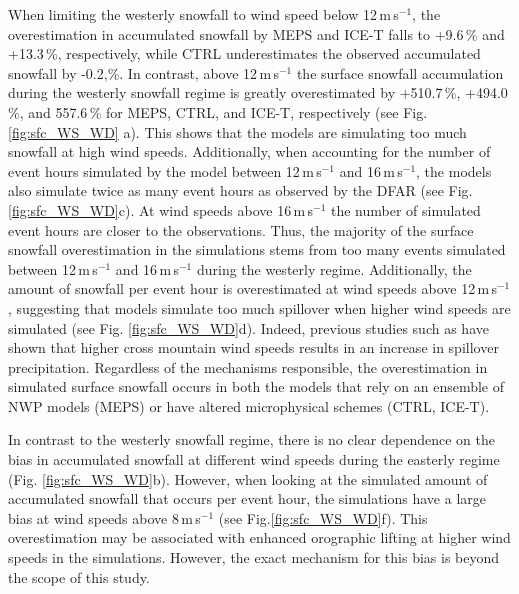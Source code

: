 \documentclass{ametsocV5}
\begin{document}
        When limiting the westerly snowfall to wind speed below 12\,m\,s$^{-1}$, the overestimation in accumulated snowfall by MEPS and ICE-T falls to +9.6\,\% and +13.3\,\%, respectively, while CTRL underestimates the observed accumulated snowfall by -0.2,\%. In contrast, above 12\,m\,s$^{-1}$ the surface snowfall accumulation during the westerly snowfall regime is greatly overestimated by +510.7\,\%, +494.0\,\%, and 557.6\,\% for MEPS, CTRL, and ICE-T, respectively (see Fig. \ref{fig:sfc_WS_WD} a). This shows that the models are simulating too much snowfall at high wind speeds. Additionally, when accounting for the number of event hours simulated by the model between 12\,m\,s$^{-1}$ and 16\,m\,s$^{-1}$, the models also simulate twice as many event hours as observed by the DFAR (see Fig. \ref{fig:sfc_WS_WD}c). At wind speeds above 16\,m\,s$^{-1}$ the number of simulated event hours are closer to the observations. Thus, the majority of the surface snowfall overestimation in the simulations stems from too many events simulated between 12\,m\,s$^{-1}$ and 16\,m\,s$^{-1}$ during the westerly regime. Additionally, the amount of snowfall per event hour is overestimated at wind speeds above 12\,m\,s$^{-1}$, suggesting that models simulate too much spillover when higher wind speeds are simulated (see Fig. \ref{fig:sfc_WS_WD}d). Indeed, previous studies such as \citet{chater_atmospheric_1998,kaplan_role_2012} have shown that higher cross mountain wind speeds results in an increase in spillover precipitation. Regardless of the mechanisms responsible, the overestimation in simulated surface snowfall occurs in both the models that rely on an ensemble of NWP models (MEPS) or have altered microphysical schemes (CTRL, ICE-T). 
        
        In contrast to the westerly snowfall regime, there is no clear dependence on the bias in accumulated snowfall at different wind speeds during the easterly regime (Fig. \ref{fig:sfc_WS_WD}b). However, when looking at the simulated amount of accumulated snowfall that occurs per event hour, the simulations have a large bias at wind speeds above 8\,m\,s$^{-1}$ (see Fig.\ref{fig:sfc_WS_WD}f). This overestimation may be associated with enhanced orographic lifting at higher wind speeds in the simulations. However, the exact mechanism for this bias is beyond the scope of this study.
        
\end{document}
